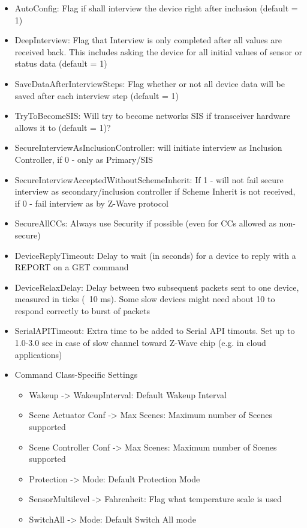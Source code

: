 \begin{itemize}
\item AutoConfig: Flag if \zway shall interview the device right after inclusion (default = 1)
\item DeepInterview: Flag that Interview is only completed after all values are received 
back. This includes asking the device for all initial values of sensor or status data (default = 1)
\item SaveDataAfterInterviewSteps: Flag whether or not all device data will be saved after each interview step (default = 1)
\item TryToBecomeSIS: Will \zway try to become networks SIS if transceiver hardware allows it to (default = 1)?

\item SecureInterviewAsInclusionController: \zway will initiate interview as Inclusion Controller, if 0 - only as Primary/SIS
\item SecureInterviewAcceptedWithoutSchemeInherit: If 1 - \zway will not fail secure interview 
as secondary/inclusion controller if Scheme Inherit is not received, if 0 - fail interview as by Z-Wave protocol
\item SecureAllCCs: Always use Security if possible (even for CCs allowed as non-secure)
\item DeviceReplyTimeout: Delay to wait (in seconds) for a device to reply with a REPORT on a GET command
\item DeviceRelaxDelay: Delay between two subsequent packets sent to one device, measured 
in ticks (~10 ms). Some slow devices might need about 10 to respond correctly to burst of packets
\item SerialAPITimeout: Extra time to be added to Serial API timouts. Set up to 1.0-3.0 
sec in case of slow channel toward Z-Wave chip (e.g. in cloud applications) 
\item Command Class-Specific Settings
\begin{itemize}
\item Wakeup -> WakeupInterval: Default Wakeup Interval
\item Scene Actuator Conf -> Max Scenes: Maximum number of Scenes supported
\item Scene Controller Conf -> Max Scenes: Maximum number of Scenes supported
\item Protection -> Mode: Default Protection Mode
\item SensorMultilevel -> Fahrenheit: Flag what temperature scale is used
\item SwitchAll -> Mode: Default Switch All mode

\end{itemize}
\end{itemize}
